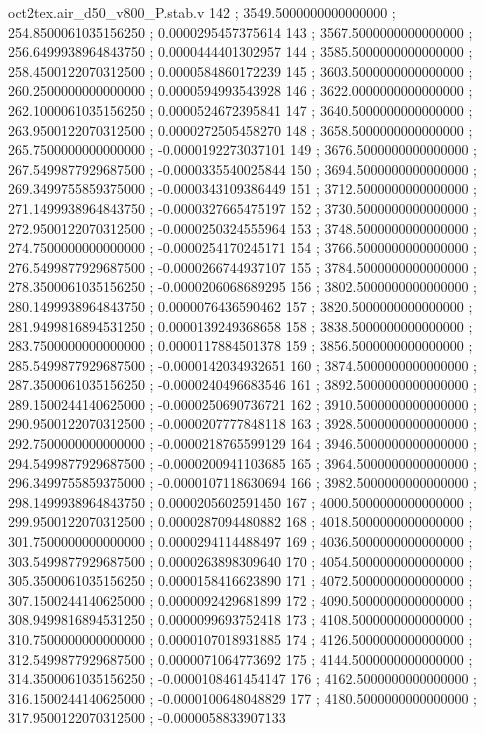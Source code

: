 \begin{filecontents}[overwrite]{oct2tex.air_d50_v800_P.stab.v}
142 ; 3549.5000000000000000 ; 254.8500061035156250 ; 0.0000295457375614
143 ; 3567.5000000000000000 ; 256.6499938964843750 ; 0.0000444401302957
144 ; 3585.5000000000000000 ; 258.4500122070312500 ; 0.0000584860172239
145 ; 3603.5000000000000000 ; 260.2500000000000000 ; 0.0000594993543928
146 ; 3622.0000000000000000 ; 262.1000061035156250 ; 0.0000524672395841
147 ; 3640.5000000000000000 ; 263.9500122070312500 ; 0.0000272505458270
148 ; 3658.5000000000000000 ; 265.7500000000000000 ; -0.0000192273037101
149 ; 3676.5000000000000000 ; 267.5499877929687500 ; -0.0000335540025844
150 ; 3694.5000000000000000 ; 269.3499755859375000 ; -0.0000343109386449
151 ; 3712.5000000000000000 ; 271.1499938964843750 ; -0.0000327665475197
152 ; 3730.5000000000000000 ; 272.9500122070312500 ; -0.0000250324555964
153 ; 3748.5000000000000000 ; 274.7500000000000000 ; -0.0000254170245171
154 ; 3766.5000000000000000 ; 276.5499877929687500 ; -0.0000266744937107
155 ; 3784.5000000000000000 ; 278.3500061035156250 ; -0.0000206068689295
156 ; 3802.5000000000000000 ; 280.1499938964843750 ; 0.0000076436590462
157 ; 3820.5000000000000000 ; 281.9499816894531250 ; 0.0000139249368658
158 ; 3838.5000000000000000 ; 283.7500000000000000 ; 0.0000117884501378
159 ; 3856.5000000000000000 ; 285.5499877929687500 ; -0.0000142034932651
160 ; 3874.5000000000000000 ; 287.3500061035156250 ; -0.0000240496683546
161 ; 3892.5000000000000000 ; 289.1500244140625000 ; -0.0000250690736721
162 ; 3910.5000000000000000 ; 290.9500122070312500 ; -0.0000207777848118
163 ; 3928.5000000000000000 ; 292.7500000000000000 ; -0.0000218765599129
164 ; 3946.5000000000000000 ; 294.5499877929687500 ; -0.0000200941103685
165 ; 3964.5000000000000000 ; 296.3499755859375000 ; -0.0000107118630694
166 ; 3982.5000000000000000 ; 298.1499938964843750 ; 0.0000205602591450
167 ; 4000.5000000000000000 ; 299.9500122070312500 ; 0.0000287094480882
168 ; 4018.5000000000000000 ; 301.7500000000000000 ; 0.0000294114488497
169 ; 4036.5000000000000000 ; 303.5499877929687500 ; 0.0000263898309640
170 ; 4054.5000000000000000 ; 305.3500061035156250 ; 0.0000158416623890
171 ; 4072.5000000000000000 ; 307.1500244140625000 ; 0.0000092429681899
172 ; 4090.5000000000000000 ; 308.9499816894531250 ; 0.0000099693752418
173 ; 4108.5000000000000000 ; 310.7500000000000000 ; 0.0000107018931885
174 ; 4126.5000000000000000 ; 312.5499877929687500 ; 0.0000071064773692
175 ; 4144.5000000000000000 ; 314.3500061035156250 ; -0.0000108461454147
176 ; 4162.5000000000000000 ; 316.1500244140625000 ; -0.0000100648048829
177 ; 4180.5000000000000000 ; 317.9500122070312500 ; -0.0000058833907133

\end{filecontents}
